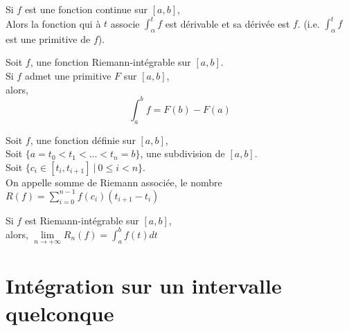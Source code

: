 \documentclass[../main.tex]{subfile}
\begin{document}
\begin{theo}
	Si $f$ est une fonction continue sur $[a, b]$, \\
	Alors la fonction qui à $t$ associe $\int_\alpha^t f$ est dérivable et sa dérivée est $f$. (i.e. $\int_\alpha^t f$ est une primitive de $f$).
\end{theo}

\begin{theo}
	Soit $f$, une fonction Riemann-intégrable sur $[a, b]$.\\
	Si $f$ admet une primitive $F$ sur $[a, b]$, \\
	alors, \\
	$$\int_a^b f = F(b) - F(a)$$
\end{theo}
































\begin{defi}
	Soit $f$, une fonction définie sur $[a, b]$, \\
	Soit $\{a=t_0 < t_1 < ... < t_n = b\}$, une subdivision de $[a, b]$.\\
	Soit $\{ c_i \in [t_i, t_{i+1}] \ | \ 0 \leq i <n\}$.\\

	On appelle somme de Riemann associée, le nombre $R(f) = \sum\limits_{i=0}^{n-1} f(c_i)(t_{i+1} - t_i)$
\end{defi}

\begin{theo}
	Si $f$ est Riemann-intégrable sur $[a, b]$, \\
	alors, $\lim\limits_{n \to + \infty} R_n(f) = \int_a^b f(t)dt$
\end{theo}

\section{Intégration sur un intervalle quelconque}
\end{document}

